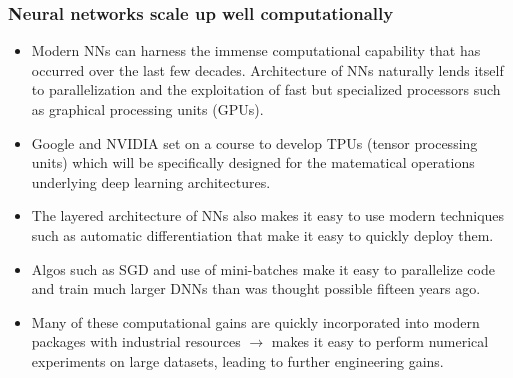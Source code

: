 \documentclass[norsk,a4paper,11pt]{article}
\begin{document}
\subsubsection{Neural networks scale up well computationally}
\begin{itemize}
	\item Modern NNs can harness the immense computational capability that has occurred over the last few decades. Architecture of NNs naturally lends itself to parallelization and the exploitation of fast but specialized processors such as graphical processing units (GPUs). 
	\item Google and NVIDIA set on a course to develop TPUs (tensor processing units) which will be specifically designed for the matematical operations underlying deep learning architectures.
	\item The layered architecture of NNs also makes it easy to use modern techniques such as automatic differentiation that make it easy to quickly deploy them.
	\item Algos such as SGD and use of mini-batches make it easy to parallelize code and train much larger DNNs than was thought possible fifteen years ago.
	\item Many of these computational gains are quickly incorporated into modern packages with industrial resources $\rightarrow$ makes it easy to perform numerical experiments on large datasets, leading to further engineering gains.
\end{itemize}
\end{document}
